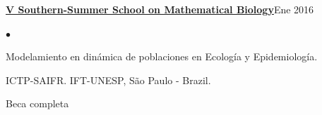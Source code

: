 \documentclass[margin,line]{res}
\newenvironment{list2}{
	\begin{list}{$\bullet$}{%
			\setlength{\itemsep}{0in}
			\setlength{\parsep}{0in} \setlength{\parskip}{0in}
			\setlength{\topsep}{0in} \setlength{\partopsep}{0in}
			\setlength{\leftmargin}{0.2in}}}{\end{list}}
\begin{document}
\begin{resume}
		
		{\bf \href{https://www.ictp-saifr.org/v-southern-summer-school-on-mathematical-biology/}{V Southern-Summer School on Mathematical Biology}}\hfill {Ene 2016}\\
		\vspace*{-.1in}%
		\begin{list2} %
			\item Modelamiento en dinámica de poblaciones en Ecología y Epidemiología.%
			\item ICTP-SAIFR. IFT-UNESP, S{\~a}o Paulo - Brazil.%
			\item Beca completa
		\end{list2}
		
		
		
		

\end{resume}
\end{document}

